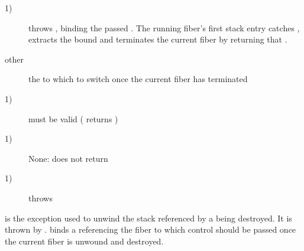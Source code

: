 \begin{description}
    \item[1)] throws \unwindex, binding the passed \fiber. The running fiber's
              first stack entry catches \unwindex, extracts the bound \fiber
              and terminates the current fiber by returning that \fiber.
\end{description}

\begin{description}
    \item[other] the \fiber to which to switch once the current fiber has terminated
\end{description}

\begin{description}
    \item[1)]  must be valid ( returns )
\end{description}

\begin{description}
    \item[1)] None: \unwindfib does not return
\end{description}

\begin{description}
    \item[1)] throws \unwindex
\end{description}



is the exception used to unwind the stack referenced by a \fiber being destroyed.
It is thrown by \unwindfib. \unwindex binds a \fiber referencing the fiber to
which control should be passed once the current fiber is unwound and destroyed.
